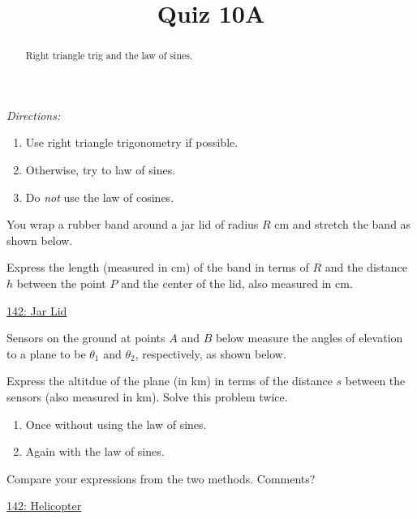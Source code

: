 \documentclass{ximera}
\title{Quiz 10A}
\begin{document}
\begin{abstract}
Right triangle trig and the law of sines.
\end{abstract}
\maketitle



\emph{Directions:}
\begin{enumerate}
\item  Use right triangle trigonometry if possible. 

\item Otherwise, try to law of sines. 

\item Do \emph{not} use the law of cosines.
\end{enumerate}

\begin{question} \label{QdfRDEfeERER}
You wrap a rubber band around a jar lid of radius $R$ cm and stretch the band as shown below.

Express the length (measured in cm) of the band in terms of $R$ and the distance $h$ between the point $P$ and the center of the lid, also measured in cm.


\begin{onlineOnly}
    \begin{center}
\end{center}
\end{onlineOnly}

\href{https://www.desmos.com/calculator/wz5qiyj4od}{142: Jar Lid}

\end{question}


\begin{question} \label{Q454ddtgHHERER}
Sensors on the ground at points $A$ and $B$ below measure the angles of elevation to a plane to be $\theta_1$ and $\theta_2$, respectively, as shown below.

Express the altitdue of the plane (in km) in terms of the distance $s$ between the sensors (also measured in km). Solve this problem twice.

\begin{enumerate}
\item Once without using the law of sines.

\item Again with the law of sines.
\end{enumerate}

Compare your expressions from the two methods. Comments?


\begin{onlineOnly}
    \begin{center}
\end{center}
\end{onlineOnly}

\href{https://www.desmos.com/calculator/zbktegkke4}{142: Helicopter}

\end{question}
\end{document}
